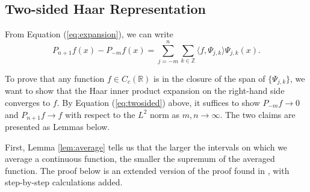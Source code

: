 \documentclass[11pt]{amsart}
\theoremstyle{theorem} %
\theoremstyle{definition}
\theoremstyle{example}
\theoremstyle{remark}
\numberwithin{equation}{section}
\newcommand{\R}{\mathbb{R}}
\newcommand{\Z}{\mathbb{Z}}
\begin{document}
\subsection{Two-sided Haar Representation} \label{subsec:two-sided}
From Equation (\ref{eq:expansion}), we can write
\begin{equation} \label{eq:twosided}
	P_{n+1}f(x) - P_{-m}f(x) = \sum_{j=-m}^{n} \sum_{k \in \Z} \langle f, \varPsi_{j,k} \rangle \varPsi_{j,k}(x).
\end{equation}

To prove that any function $ f \in C_c(\R) $ is in the closure of the span of $ \{ \varPsi_{j,k} \} $, we want to show that the Haar inner product expansion on the right-hand side converges to $ f $. By Equation (\ref{eq:twosided}) above, it suffices to show $ P_{-m}f \to 0 $ and $ P_{n+1}f \to f $ with respect to the $ L^2 $ norm as $ m, n \to \infty $. The two claims are presented as Lemmas below.

\vspace{8pt}
First, Lemma \ref{lem:average} tells us that the larger the intervals on which we average a continuous function, the smaller the supremum of the averaged function. The proof below is an extended version of the proof found in \cite{pinsky}, with step-by-step calculations added.
\end{document}
